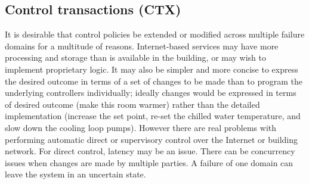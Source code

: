 


\subsection{Control transactions (CTX)}

It is desirable that control policies be extended or modified across multiple failure domains for a multitude of reasons.  Internet-based services may have more processing and storage than is available in the building, or may wish to implement proprietary logic.  It may also be simpler and more concise to express the desired outcome in terms of a set of changes to be made than to program the underlying controllers individually; ideally changes would be expressed in terms of desired outcome (make this room warmer) rather than the detailed implementation (increase the set point, re-set the chilled water temperature, and slow down the cooling loop pumps).  However there are real problems with performing automatic direct or supervisory control over the Internet or building network.  For direct control, latency may be an issue.  There can be concurrency issues when changes are made by multiple parties.  A failure of one  domain can leave the system in an uncertain state.

